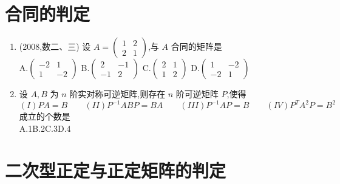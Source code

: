 \documentclass[12pt, a4paper, oneside, UTF8]{ctexbook}
\begin{document}
\section{合同的判定}

\begin{enumerate}[label=\arabic*.,start=4]
    \item (2008,数二、三) 设 $ A = \begin{pmatrix} 1 & 2 \\ 2 & 1 \end{pmatrix} $,与 $ A $ 合同的矩阵是 \\
        A.$ \begin{pmatrix} -2 & 1 \\ 1 & -2 \end{pmatrix} $\qquad
        B.$ \begin{pmatrix} 2 & -1 \\ -1 & 2 \end{pmatrix} $\qquad
        C.$ \begin{pmatrix} 2 & 1 \\ 1 & 2 \end{pmatrix} $\qquad
        D.$\begin{pmatrix} 1 & -2 \\ -2 & 1 \end{pmatrix} $
    
    \begin{solution}
    \newpage
    \end{solution}
    
    \item 设 $ A, B $ 为 $ n $ 阶实对称可逆矩阵,则存在 $ n $ 阶可逆矩阵 $ P $,使得 \\
    $(I)PA=B\qquad (II)P^{-1}ABP=BA\qquad (III)P^{-1}AP=B\qquad(IV)P^{T}A^2P=B^2$ \\
    成立的个数是 \\
    A.1\qquad B.2\qquad C.3\qquad D.4
    
    \begin{solution}
    \newpage
    \end{solution}
\end{enumerate}

\section{二次型正定与正定矩阵的判定}
\end{document}
